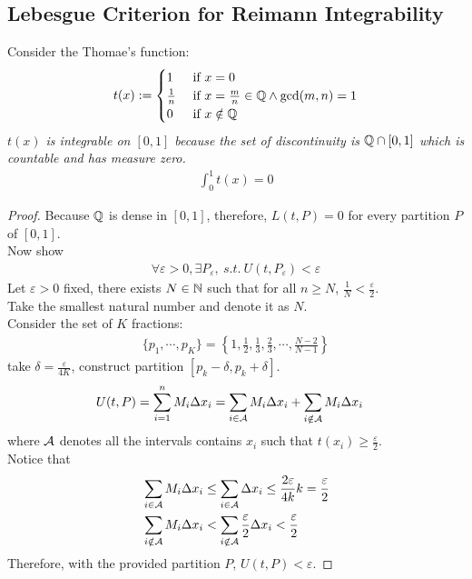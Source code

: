 \documentclass[11pt]{article}
\begin{document}
	\subsection{Lebesgue Criterion for Reimann Integrability}
	\begin{example}
		Consider the Thomae's function:
		\begin{align}
			t(x) := \begin{cases}
				1 &\text{{ if }} x = 0 \\
				\frac{1}{n} &\text{{ if }} x = \frac{m}{n} \in \mathbb{Q} \land \gcd(m, n) = 1 \\
				0 &\text{{ if }} x \notin \mathbb{Q}
			\end{cases}
		\end{align}
		\emph{$t(x)$ is integrable on $[0, 1]$ because the set of discontinuity is $\mathbb{Q} \cap [0, 1]$ which is countable and has measure zero.}
		\begin{align}
			\int_0^1 t(x) = 0 
		\end{align}
	\end{example}
	
	\begin{proof}
		Because $\mathbb{Q}$ is dense in $[0, 1]$, therefore, $L(t, P) = 0$ for every partition $P$ of $[0,1]$. \\
		Now show
		\begin{align}
			\forall \varepsilon > 0, \exists P_\varepsilon,\ s.t.\ U(t, P_\varepsilon) < \varepsilon
		\end{align}
		Let $\varepsilon > 0$ fixed, there exists $N \in \mathbb{N}$ such that for all $n \geq N$, $\frac{1}{N} < \frac{\varepsilon}{2}$. \\
		Take the smallest natural number and denote it as $N$. \\
		Consider the set of $K$ fractions:
		\begin{align}
			\{p_1, \cdots, p_K\} =  \left\{1, \frac{1}{2}, \frac{1}{3}, \frac{2}{3}, \cdots, \frac{N-2}{N-1} \right\}
		\end{align}
		take $\delta = \frac{\varepsilon}{4K}$, construct partition $[p_k - \delta, p_k + \delta]$.
		\begin{align}
			U(t, P) &= \sum_{i=1}^n M_i \Delta x_i = \sum_{i \in \mathcal{{A}}} M_i \Delta x_i + \sum_{i \notin \mathcal{{A}}} M_i \Delta x_i
		\end{align}
		where $\mathcal{{A}}$ denotes all the intervals contains $x_i$ such that $t(x_i) \geq \frac{\varepsilon}{2}$. \\
		Notice that
		\begin{align}
			&\sum_{i \in \mathcal{{A}}} M_i \Delta x_i 
			\leq \sum_{i \in \mathcal{{A}}} \Delta x_i 
			\leq \frac{2 \varepsilon}{4k} k 
			= \frac{\varepsilon}{2} \\
			&\sum_{i \notin \mathcal{{A}}} M_i \Delta x_i
			< \sum_{i \notin \mathcal{{A}}} \frac{\varepsilon}{2} \Delta x_i
			< \frac{\varepsilon}{2}
		\end{align}
		Therefore, with the provided partition $P$, $U(t, P) < \varepsilon$.
	\end{proof}
	
\end{document}
